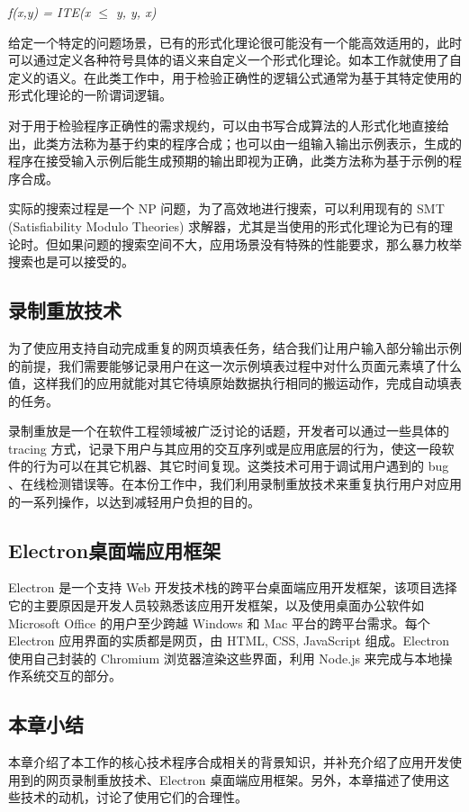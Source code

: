 \documentclass[design, pageheader]{njubachelor}
\begin{document}
{\itshape f(x,y) = ITE(x $\leq$ y, y, x)}

给定一个特定的问题场景，已有的形式化理论很可能没有一个能高效适用的，此时可以通过定义各种符号具体的语义来自定义一个形式化理论。如本工作就使用了自定义的语义。在此类工作中，用于检验正确性的逻辑公式通常为基于其特定使用的形式化理论的一阶谓词逻辑。

对于用于检验程序正确性的需求规约，可以由书写合成算法的人形式化地直接给出，此类方法称为基于约束的程序合成；也可以由一组输入输出示例表示，生成的程序在接受输入示例后能生成预期的输出即视为正确，此类方法称为基于示例的程序合成。

实际的搜索过程是一个 NP 问题，为了高效地进行搜索，可以利用现有的 SMT (Satisfiability Modulo Theories) 求解器，尤其是当使用的形式化理论为已有的理论时。但如果问题的搜索空间不大，应用场景没有特殊的性能要求，那么暴力枚举搜索也是可以接受的。

\subsection{录制重放技术}
为了使应用支持自动完成重复的网页填表任务，结合我们让用户输入部分输出示例的前提，我们需要能够记录用户在这一次示例填表过程中对什么页面元素填了什么值，这样我们的应用就能对其它待填原始数据执行相同的搬运动作，完成自动填表的任务。

录制重放是一个在软件工程领域被广泛讨论的话题，开发者可以通过一些具体的 tracing 方式，记录下用户与其应用的交互序列或是应用底层的行为，使这一段软件的行为可以在其它机器、其它时间复现。这类技术可用于调试用户遇到的 bug \cite{burg13}、在线检测错误\cite{ronsse99}等。在本份工作中，我们利用录制重放技术来重复执行用户对应用的一系列操作，以达到减轻用户负担的目的。

\subsection{Electron桌面端应用框架}
Electron 是一个支持 Web 开发技术栈的跨平台桌面端应用开发框架，该项目选择它的主要原因是开发人员较熟悉该应用开发框架，以及使用桌面办公软件如 Microsoft Office 的用户至少跨越 Windows 和 Mac 平台的跨平台需求。每个 Electron 应用界面的实质都是网页，由 HTML, CSS, JavaScript 组成。Electron 使用自己封装的 Chromium 浏览器渲染这些界面，利用 Node.js 来完成与本地操作系统交互的部分。

\subsection{本章小结}

本章介绍了本工作的核心技术程序合成相关的背景知识，并补充介绍了应用开发使用到的网页录制重放技术、Electron 桌面端应用框架。另外，本章描述了使用这些技术的动机，讨论了使用它们的合理性。
\end{document}
